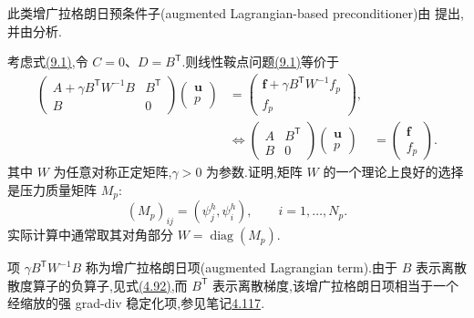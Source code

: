 \begin{note}[基于增广拉格朗日方法的预条件子]
\label{note:chapter9-augmented-lagrangian}\label{note:linear-saddle-point-augmented-lagrangian-preconditioner}
此类增广拉格朗日预条件子(augmented Lagrangian-based preconditioner)由 \textcite{BenziOlshanskii2006} 提出,并由\textcite{BenziWang2011}分析.

考虑式\hyperref[eq:chapter9-coupled-system]{(9.1)},令 $C=0$、$D=B^{\mathsf T}$.则线性鞍点问题\hyperref[eq:chapter9-coupled-system]{(9.1)}等价于
\begin{equation}\label{eq:chapter9-augmented-lagrangian-system}
\begin{aligned}
\begin{pmatrix}A+\gamma B^{\mathsf T}W^{-1}B&B^{\mathsf T}\\B&0\end{pmatrix}
\begin{pmatrix}\bm u\\p\end{pmatrix}
&=\begin{pmatrix}\bm f+\gamma B^{\mathsf T}W^{-1}f_p\\f_p\end{pmatrix},\\
&\Longleftrightarrow
\begin{pmatrix}A&B^{\mathsf T}\\B&0\end{pmatrix}
\begin{pmatrix}\bm u\\p\end{pmatrix}
&=\begin{pmatrix}\bm f\\f_p\end{pmatrix}.
\end{aligned}
\end{equation}
其中 $W$ 为任意对称正定矩阵,$\gamma>0$ 为参数.\textcite{BenziOlshanskii2006}证明,矩阵 $W$ 的一个理论上良好的选择是压力质量矩阵 $M_p$:
\[
(M_p)_{ij}=(\psi_j^h,\psi_i^h),\qquad i=1,\ldots,N_p.
\]
实际计算中通常取其对角部分 $W=\operatorname{diag}(M_p)$.

项 $\gamma B^{\mathsf T}W^{-1}B$ 称为增广拉格朗日项(augmented Lagrangian term).由于 $B$ 表示离散散度算子的负算子,见式\hyperref[eq:stokes-algebraic-matrix-b]{(4.92)},而 $B^{\mathsf T}$ 表示离散梯度,该增广拉格朗日项相当于一个经缩放的强 grad-div 稳定化项,参见笔记\hyperref[note:stokes-grad-div-term]{4.117}.


\end{note}
